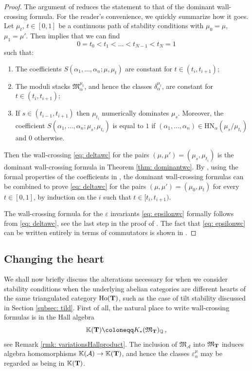 \documentclass[12pt]{amsart}
\theoremstyle{definition}
\newcommand{\BK}{{\mathbb{K}}}
\newcommand{\BQ}{{\mathbb{Q}}}
\newcommand{\CA}{{\mathcal A}}
\newcommand{\1}{\mathbf 1}
\newcommand{\bfT}{{\bf T}}
\newcommand{\FM}{{\mathfrak{M}}}
\newcommand{\HN}{\mathrm{HN}}
\begin{document}
\begin{proof}
The argument of \cite[Section 11]{joyce} reduces the statement to that of the dominant wall-crossing formula. For the reader's convenience, we quickly summarize how it goes. Let $\mu_t$, $t\in [0,1]$ be a continuous path of stability conditions with $\mu_0=\mu$, $\mu_1=\mu'$. Then \cite[Assumption 5.3]{joyce} implies that we can find
\[0=t_0<t_1<\ldots<t_{N-1}<t_N=1\]
such that:
\begin{enumerate}
    \item The coefficients $S(\alpha_1, \ldots, \alpha_n; \mu, \mu_t)$ are constant for $t\in (t_i, t_{i+1})$;
    \item The moduli stacks $\FM_\alpha^{\mu_t}$, and hence the classes $\delta_{\alpha}^{\mu_t}$, are constant for $t\in (t_i, t_{i+1})$;
    \item If $s\in (t_{i-1}, t_{i+1})$ then $\mu_{t_i}$ numerically dominates $\mu_{s}$. Moreover, the coefficient $S(\alpha_1, \ldots, \alpha_n; \mu_s, \mu_{t_i})$ is equal to $1$ if $(\alpha_1, \ldots, \alpha_n)\in \HN_\alpha(\mu_s/\mu_{t_i})$ and 0 otherwise.
\end{enumerate}
Then the wall-crossing \eqref{eq: deltawc} for the pairs $(\mu, \mu')=(\mu_s, \mu_{t_i})$ is the dominant wall-crossing formula in Theorem \ref{thm: dominantwc}. By \cite[Lemma 11.5]{joyce}, using the formal properties of the coefficients in \cite[Theorem 4.5]{JO06IV}, the dominant wall-crossing formulas can be combined to prove
\eqref{eq: deltawc} for the pairs $(\mu, \mu')=(\mu_0, \mu_{t})$ for every $t\in [0,1]$, by induction on the $i$ such that $t\in [t_i, t_{i+1})$. 

The wall-crossing formula for the $\varepsilon$ invariants \eqref{eq: epsilonwc} formally follows from \eqref{eq: deltawc}, see the last step in the proof of \cite[Theorem 5.2]{JO06IV}. The fact that \eqref{eq: epsilonwc}  can be written entirely in terms of commutators is shown in \cite[Theorem 5.4]{JO06IV}.
\end{proof}


\subsection{Changing the heart}\label{subsec: changinghearts}
We shall now briefly discuss the alterations necessary for when we consider stability conditions when the underlying abelian categories are different hearts of the same triangulated category $\textup{Ho}(\bfT)$, such as the case of tilt stability discussed in Section \ref{subsec: tild}. First of all, the natural place to write wall-crossing formulas is in the Hall algebra
\[\BK(\bfT)\coloneqq K_\ast(\FM_{\bfT})_\BQ\,,\]
see Remark \ref{rmk: variationsHallproduct}. The inclusion of $\FM_\CA$ into $\FM_\bfT$ induces algebra homomorphisms $\BK(\CA)\to \BK(\bfT)$, and hence the classes $\varepsilon_\alpha^{ \mu}$ may be regarded as being in $\BK(\bfT)$. 
\end{document}
